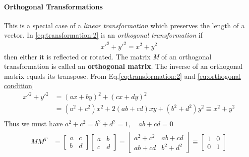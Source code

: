             \paragraph{Orthogonal Transformations} %
            \label{par:Orthogonal Transformations}
            This is a special case of a \textit{linear transformation} which preserves the length of a vector.
            In \eqref{eq:transformation:2} is an \textit{orthogonal transformation} if
            \begin{align}
                \label{eq:orthogonal condition}
                x'^2 + y'^2  = x^2 + y^2
            \end{align}
            then either it is reflected or rotated. The matrix \textit{M} of an orthogonal transformation is called an \textbf{orthogonal matrix}.
            The inverse of an orthogonal matrix equals its transpose. 
            From Eq.\eqref{eq:transformation:2} and \eqref{eq:orthogonal condition}
            \begin{align*}
                x'^2 + y'^2 &= (ax + by)^2 + (cx + dy)^2 \\
                            &=(a^2 +c^2)x^2 +2(ab+cd)xy+(b^2 +d^2)y^2 \equiv x^2 +y^2\\
                        \end{align*}
            Thus we must have $a^2 +c^2=b^2 +d^2=1,\quad ab+cd=0$
            \begin{align*}
                \begin{aligned}
                    MM^T &= \begin{bmatrix}
                        a & c \\ b & d
                    \end{bmatrix}
                    \begin{bmatrix}
                        a & b \\ c & d
                    \end{bmatrix} = 
                    \begin{bmatrix}
                        a^2 +c^2 & ab+cd \\
                        ab+cd & b^2 +d^2
                    \end{bmatrix}
                    \equiv \begin{bmatrix}
                        1 & 0 \\ 0 & 1
                    \end{bmatrix}
                \end{aligned}
            \end{align*}
                                
